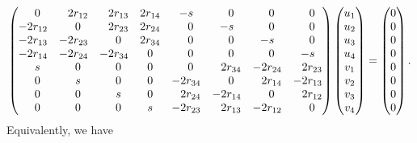 \begin{gather}
\begin{pmatrix}
\hphantom{-}0 & \hphantom{-}2r_{12} & \hphantom{-}2r_{13} & 2r_{14} & -s & \hphantom{-}0 & \hphantom{-}0 & \hphantom{-}0
\\
-2r_{12} & \hphantom{-}0 & \hphantom{-}2r_{23} &2r_{24} & \hphantom{-}0 & -s & \hphantom{-}0 & \hphantom{-}0
\\
-2r_{13} & -2r_{23} & \hphantom{-}0 & 2r_{34} & \hphantom{-}0 & \hphantom{-}0 & -s & \hphantom{-}0
\\
-2 r_{14} & -2r_{24} & -2r_{34} & 0 & \hphantom{-}0 & \hphantom{-}0 & \hphantom{-}0 & -s
\\
\hphantom{-}s & \hphantom{-}0 & \hphantom{-}0 & 0 & \hphantom{-}0 & \hphantom{-}2r_{34} & -2r_{24} & \hphantom{-}2r_{23}
\\
\hphantom{-}0 & \hphantom{-}s & \hphantom{-}0 & 0 & -2r_{34} & \hphantom{-}0 & \hphantom{-}2r_{14} & -2r_{13}
\\
\hphantom{-}0 & \hphantom{-}0 & \hphantom{-}s & 0 & \hphantom{-}2r_{24} & -2r_{14} & \hphantom{-}0 & \hphantom{-}2r_{12}
\\
\hphantom{-}0 & \hphantom{-}0 & \hphantom{-}0 & s & -2r_{23} & \hphantom{-}2r_{13} & -2r_{12} & \hphantom{-}0
\end{pmatrix}
\begin{pmatrix}
u_1
\\
u_2
\\
u_3
\\
u_4
\\
v_1
\\
v_2
\\
v_3
\\
v_4
\end{pmatrix} =
\begin{pmatrix}
0
\\
0
\\
0
\\
0
\\
0
\\
0
\\
0
\\
0
\end{pmatrix}. \label{star}
\end{gather}
Equivalently, we have
